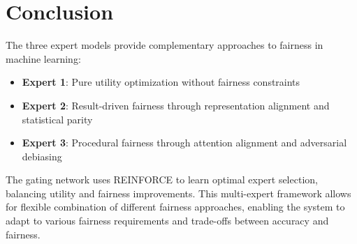 \documentclass[11pt]{article}
\begin{document}
\section{Conclusion}

The three expert models provide complementary approaches to fairness in machine learning:

\begin{itemize}
    \item \textbf{Expert 1}: Pure utility optimization without fairness constraints
    \item \textbf{Expert 2}: Result-driven fairness through representation alignment and statistical parity
    \item \textbf{Expert 3}: Procedural fairness through attention alignment and adversarial debiasing
\end{itemize}

The gating network uses REINFORCE to learn optimal expert selection, balancing utility and fairness improvements. This multi-expert framework allows for flexible combination of different fairness approaches, enabling the system to adapt to various fairness requirements and trade-offs between accuracy and fairness.
\end{document}
